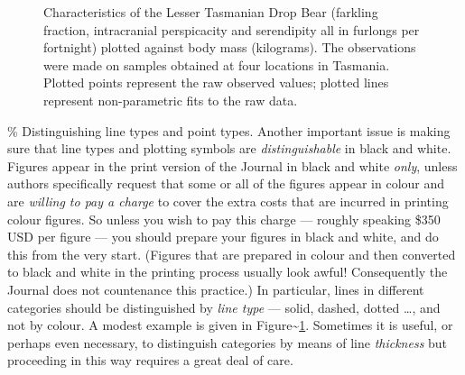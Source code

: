 \documentclass[
  times,
  doublespace]{anzsauth}
\begin{document}
\begin{figure}[htp]
\centering
{}
\caption{\label{fig:ltdb}
Characteristics of the Lesser Tasmanian Drop Bear (farkling
fraction, intracranial perspicacity and serendipity all in
furlongs per fortnight) plotted against body mass (kilograms).
The observations were made on samples obtained at four locations
in Tasmania. Plotted points represent the raw observed values;
plotted lines represent non-parametric fits to the raw data.}
\end{figure}

\% Distinguishing line types and point types. Another important issue is
making sure that line types and plotting symbols are
\emph{distinguishable} in black and white. Figures appear in the print
version of the Journal in black and white \emph{only}, unless authors
specifically request that some or all of the figures appear in colour
and are \emph{willing to pay a charge} to cover the extra costs that are
incurred in printing colour figures. So unless you wish to pay this
charge --- roughly speaking \$350 USD per figure --- you should prepare
your figures in black and white, and do this from the very start.
(Figures that are prepared in colour and then converted to black and
white in the printing process usually look awful! Consequently the
Journal does not countenance this practice.) In particular, lines in
different categories should be distinguished by \emph{line type} ---
solid, dashed, dotted \ldots, and not by colour. A modest example is
given in Figure\textasciitilde{}\ref{fig:ltdb}. Sometimes it is useful,
or perhaps even necessary, to distinguish categories by means of line
\emph{thickness} but proceeding in this way requires a great deal of
care.
\end{document}
